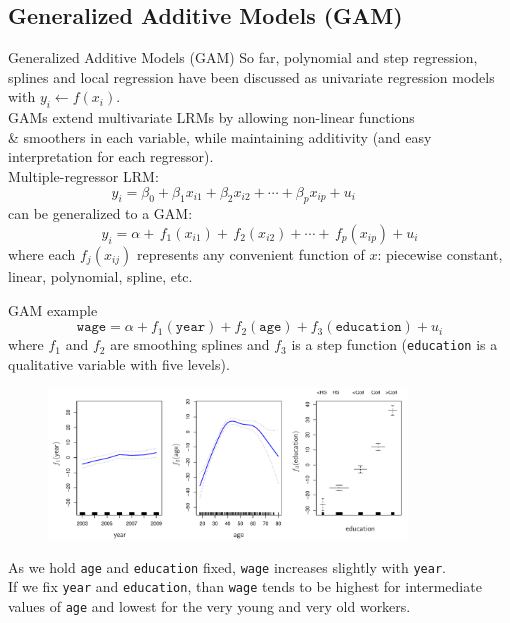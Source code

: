 \documentclass{beamer}
\begin{document}
\subsection{Generalized Additive Models (GAM)}
\begin{frame}{Generalized Additive Models (GAM)}
So far, polynomial and step regression, splines and local regression have been discussed as univariate regression models with $y_i \leftarrow f(x_i)$.\\
\medskip GAMs extend multivariate LRMs by allowing non-linear functions\\ \& smoothers in each variable, while maintaining additivity (and easy interpretation for each regressor).\\ \medskip
Multiple-regressor LRM:
$$ y_i = \beta_0 + \beta_1 x_{i1} + \beta_2 x_{i2} + \cdots + \beta_p x_{ip} + u_i~~~~~~~~~~~~~~~~~$$
can be generalized to a GAM:
$$ y_i = \alpha + \, f_1(x_{i1}) + \, f_2(x_{i2}) + \cdots + \, f_p(x_{ip}) + u_i$$ 
where each $f_j(x_{ij})$ represents any convenient function of $x$: piecewise constant, linear, polynomial, spline, etc.
\end{frame}
\begin{frame}{GAM example}
$$\texttt{wage} = \alpha + f_1(\texttt{year}) + f_2(\texttt{age}) + f_3(\texttt{education}) + u_i$$
\bigskip
where $f_1$ and $f_2$ are smoothing splines and $f_3$ is a step function (\texttt{education} is a qualitative variable with five levels).
\vspace{-0.2cm}
\begin{figure}
  \centering
  \includegraphics[trim=0cm 0cm 0cm 0cm, clip=true, width=0.85\textwidth]{IMG/ISLR712.pdf}
\end{figure}
\centering
\vspace{-0.3cm}
\tiny
As we hold \texttt{age} and \texttt{education} fixed, \texttt{wage} increases slightly with \texttt{year}.\\
If we fix \texttt{year} and \texttt{education}, than \texttt{wage} tends to be highest for intermediate \\values of  \texttt{age} and lowest for the very young and very old workers.
\end{frame}
\end{document}
